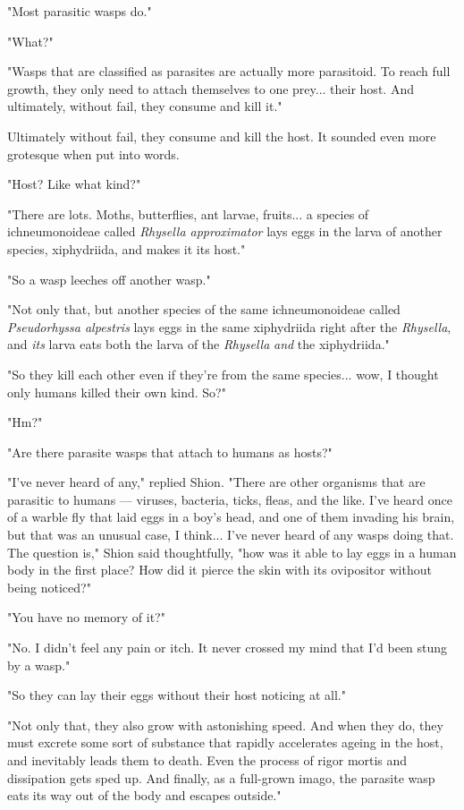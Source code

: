 "Most parasitic wasps do."

"What?"

"Wasps that are classified as parasites are actually more parasitoid. To
reach full growth, they only need to attach themselves to one prey...
their host. And ultimately, without fail, they consume and kill it."

Ultimately without fail, they consume and kill the host. It sounded even
more grotesque when put into words.

"Host? Like what kind?"

"There are lots. Moths, butterflies, ant larvae, fruits... a species of
ichneumonoideae called \emph{Rhysella approximator} lays eggs in the larva of
another species, xiphydriida, and makes it its host."

"So a wasp leeches off another wasp."

"Not only that, but another species of the same ichneumonoideae called
\emph{\emph{Pseudorhyssa alpestris}} lays eggs in the same xiphydriida right after the
\emph{Rhysella}, and \emph{its} larva eats both the larva of the \emph{Rhysella} \emph{and} the
xiphydriida."

"So they kill each other even if they're from the same species... wow, I
thought only humans killed their own kind. So?"

"Hm?"

"Are there parasite wasps that attach to humans as hosts?"

"I've never heard of any," replied Shion. "There are other organisms
that are parasitic to humans --- viruses, bacteria, ticks, fleas, and the
like. I've heard once of a warble fly that laid eggs in a boy's head,
and one of them invading his brain, but that was an unusual case, I
think... I've never heard of any wasps doing that. The question is,"
Shion said thoughtfully, "how was it able to lay eggs in a human body in
the first place? How did it pierce the skin with its ovipositor without
being noticed?"

"You have no memory of it?"

"No. I didn't feel any pain or itch. It never crossed my mind that I'd
been stung by a wasp."

"So they can lay their eggs without their host noticing at all."

"Not only that, they also grow with astonishing speed. And when they do,
they must excrete some sort of substance that rapidly accelerates ageing
in the host, and inevitably leads them to death. Even the process of
rigor mortis and dissipation gets sped up. And finally, as a full-grown
imago, the parasite wasp eats its way out of the body and escapes
outside."

